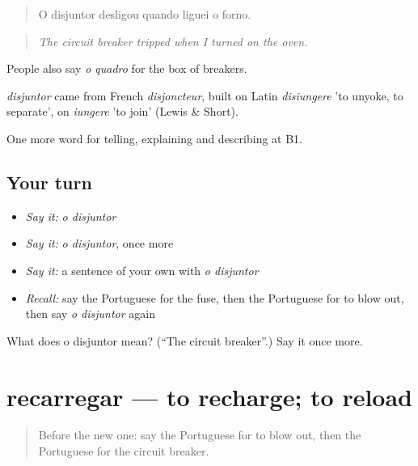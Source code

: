 \begin{quote}
O disjuntor desligou quando liguei o forno.
\end{quote}

\begin{quote}
\emph{The circuit breaker tripped when I turned on the oven.}
\end{quote}

People also say \emph{o quadro} for the box of breakers.

\begin{cousinweb}
\emph{disjuntor} came from French \emph{disjoncteur}, built on Latin \emph{disiungere} 'to unyoke, to separate', on \emph{iungere} 'to join' (Lewis \& Short).
\end{cousinweb}

\begin{grammarlens}[title={What you've built}]
One more word for telling, explaining and describing at B1.
\end{grammarlens}

\subsection*{Your turn}
\begin{itemize}
\raggedright
  \item \emph{Say it:} \emph{o disjuntor}
  \item \emph{Say it:} \emph{o disjuntor}, once more
  \item \emph{Say it:} a sentence of your own with \emph{o disjuntor}
  \item \emph{Recall:} say the Portuguese for the fuse, then the Portuguese for to blow out, then say \emph{o disjuntor} again
\end{itemize}

\begin{tcolorbox}[breakable,colback=teal!4,colframe=teal!35!black,title={Before you move on}]
What does o disjuntor mean? (\textquotedblleft{}The circuit breaker\textquotedblright{}.) Say it once more.
\end{tcolorbox}
\section[recarregar]{recarregar — to recharge; to reload}

\label{lesson:PT-C432-recarregar}



\begin{quote}
Before the new one: say the Portuguese for to blow out, then the Portuguese for the circuit breaker.
\end{quote}

